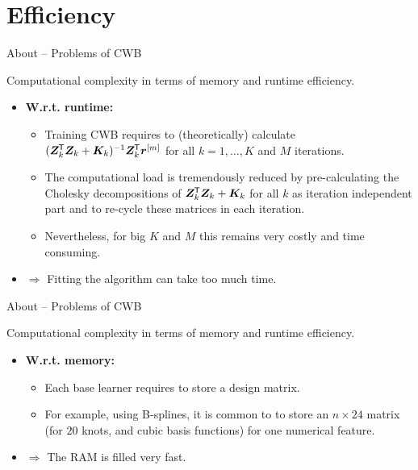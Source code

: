 \documentclass[t,10pt]{beamer}
\newcommand{\fSlide}[2]{
\begin{frame}[plain]{}%
  \vspace{4cm}%
  \Large #1\\[0.2cm]%
  {\LARGE\textbf{#2}}%
	\addtocounter{framenumber}{-1}%
\end{frame}%
}
\begin{document}

%



\section{Efficiency}

\begin{frame}{About -- Problems of CWB}

  Computational complexity in terms of memory and runtime efficiency.
  \begin{itemize}
    \item \textbf{W.r.t. runtime:}
    \begin{itemize}
      \item Training CWB requires to (theoretically) calculate $(\bm{Z}_k^{\mkern-1.5mu\mathsf{T}} \bm{Z}_k + \bm{K}_k)^{-1}\bm{Z}_k^{\mkern-1.5mu\mathsf{T}} \bm{r}^{[m]}$ for all $k = 1, \dots, K$ and $M$ iterations.
      \item The computational load is tremendously reduced by pre-calculating the Cholesky decompositions of $\bm{Z}_k^{\mkern-1.5mu\mathsf{T}} \bm{Z}_k + \bm{K}_k$ for all $k$ as iteration independent part and to re-cycle these matrices in each iteration.
      \item Nevertheless, for big $K$ and $M$ this remains very costly and time consuming.
    \end{itemize}
    \item[] $\Rightarrow$ Fitting the algorithm can take too much time.
  \end{itemize}
\end{frame}

\begin{frame}{About -- Problems of CWB}

  Computational complexity in terms of memory and runtime efficiency.
  \begin{itemize}
    \item \textbf{W.r.t. memory:}
    \begin{itemize}
      \item Each base learner requires to store a design matrix.
      \item For example, using B-splines, it is common to to store an $n\times 24$ matrix (for $20$ knots, and cubic basis functions) for one numerical feature.
    \end{itemize}
    \item[] $\Rightarrow$ The RAM is filled very fast.
  \end{itemize}
\end{frame}
\end{document}
